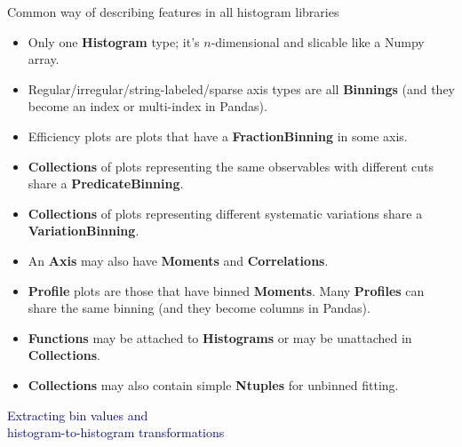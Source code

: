 \documentclass[aspectratio=169]{beamer}
\begin{document}
\begin{frame}{Common way of describing features in all histogram libraries}
\vspace{0.5 cm}
\begin{itemize}
\item Only one {\bf Histogram} type; it's $n$-dimensional and slicable like a Numpy array.
\item Regular/irregular/string-labeled/sparse axis types are all {\bf Binnings} (and they become an index or multi-index in Pandas).
\item Efficiency plots are plots that have a {\bf FractionBinning} in some axis.
\item {\bf Collections} of plots representing the same observables with different cuts share a {\bf PredicateBinning}.
\item {\bf Collections} of plots representing different systematic variations share a {\bf VariationBinning}.
\item An {\bf Axis} may also have {\bf Moments} and {\bf Correlations}.
\item {\bf Profile} plots are those that have binned {\bf Moments}. Many {\bf Profiles} can share the same binning (and they become columns in Pandas).
\item {\bf Functions} may be attached to {\bf Histograms} or may be unattached in {\bf Collections}.
\item {\bf Collections} may also contain simple {\bf Ntuples} for unbinned fitting.
\end{itemize}
\end{frame}

\begin{frame}{}
\LARGE
\begin{center}
\textcolor{darkblue}{Extracting bin values and \\ histogram-to-histogram transformations}
\end{center}
\end{frame}
\end{document}
